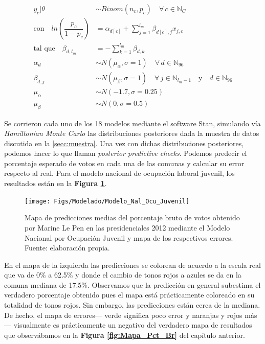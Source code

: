 \begin{align}\label{eq:Modelo_Jer_Ind}
y_c|\theta & \sim Binom(n_c,p_c) \quad \forall \, c \in \mathbb{N}_C \nonumber \\
\text{con} \quad ln\left(\dfrac{p_c}{1-p_c}\right) &= \alpha_{d[c]} + \sum\limits_{j=1}^{l_m} \beta_{d[c],j} x_{j,c} \nonumber\\ 
\text{tal que} \quad \beta_{d,l_m} &= -\sum\limits_{k = 1}^{l_m} \beta_{d,k} \nonumber \\
\alpha_d & \sim N(\mu_{\alpha}, \sigma=1) \quad \forall \, d \in \mathbb{N}_{96} \nonumber \\
\beta_{d,j} & \sim N(\mu_{\beta}, \sigma=1) \quad \forall \, j \in \mathbb{N}_{l_m-1}  \quad \text{y} \quad d \in \mathbb{N}_{96} \nonumber \\
\mu_{\alpha} &\sim N(-1.7,\sigma=0.25) \nonumber \\
\mu_{\beta} &\sim N(0,\sigma=0.5)
\end{align}

Se corrieron cada uno de los 18 modelos mediante el software Stan, simulando vía \textit{Hamiltonian Monte Carlo} las distribuciones posteriores dada la muestra de datos discutida en la \autoref{secc:muestra}. Una vez con dichas distribuciones posteriores, podemos hacer lo que \textcite{Gelman13} llaman \textit{posterior predictive checks}. Podemos predecir el porcentaje esperado de votos en cada una de las comunas y calcular su error respecto al real. Para el modelo nacional de ocupación laboral juvenil, los resultados están en la \textbf{Figura \ref{fig:Modelo_Nal_Ocu_Juvenil}}.\\

\begin{figure}[h]
	\centering
	\texttt{[image: Figs/Modelado/Modelo\_Nal\_Ocu\_Juvenil]}
	\caption{Mapa de predicciones medias del porcentaje bruto de votos obtenido por Marine Le Pen en las presidenciales 2012 mediante el Modelo Nacional por Ocupación Juvenil y mapa de los respectivos errores. Fuente: elaboración propia.}
	\label{fig:Modelo_Nal_Ocu_Juvenil}
\end{figure}

En el mapa de la izquierda las predicciones se colorean de acuerdo a la escala real que va de 0\% a 62.5\% y donde el cambio de tonos rojos a azules se da en la comuna mediana de 17.5\%. Observamos que la predicción en general subestima el verdadero porcentaje obtenido pues el mapa está prácticamente coloreado en su totalidad de tonos rojos. Sin embargo, las predicciones están cerca de la mediana. De hecho, el mapa de errores--- verde significa poco error y naranjas y rojos más--- visualmente es prácticamente un negativo del verdadero mapa de resultados que observábamos en la \textbf{Figura \ref{fig:Mapa_Pct_Br}} del capítulo anterior.\\

